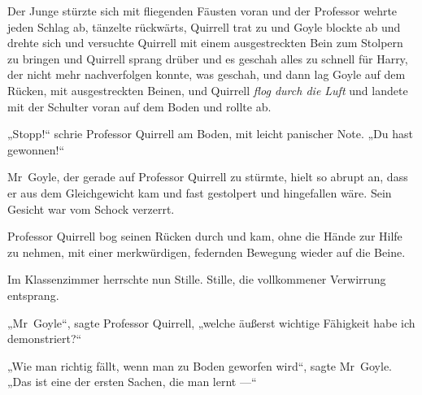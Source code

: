 Der Junge stürzte sich mit fliegenden Fäusten voran und der Professor wehrte jeden Schlag ab, tänzelte rückwärts, Quirrell trat zu und Goyle blockte ab und drehte sich und versuchte Quirrell mit einem ausgestreckten Bein zum Stolpern zu bringen und Quirrell sprang drüber und es geschah alles zu schnell für Harry, der nicht mehr nachverfolgen konnte, was geschah, und dann lag Goyle auf dem Rücken, mit ausgestreckten Beinen, und Quirrell \emph{flog durch die Luft} und landete mit der Schulter voran auf dem Boden und rollte ab.

„Stopp!“ schrie Professor Quirrell am Boden, mit leicht panischer Note.
„Du hast gewonnen!“

Mr~Goyle, der gerade auf Professor Quirrell zu stürmte, hielt so abrupt an, dass er aus dem Gleichgewicht kam und fast gestolpert und hingefallen wäre. Sein Gesicht war vom Schock verzerrt.

Professor Quirrell bog seinen Rücken durch und kam, ohne die Hände zur Hilfe zu nehmen, mit einer merkwürdigen, federnden Bewegung wieder auf die Beine.

Im Klassenzimmer herrschte nun Stille. Stille, die vollkommener Verwirrung entsprang.

„Mr~Goyle“, sagte Professor Quirrell, „welche äußerst wichtige Fähigkeit habe ich demonstriert?“

„Wie man richtig fällt, wenn man zu Boden geworfen wird“, sagte Mr~Goyle.
„Das ist eine der ersten Sachen, die man lernt —“

